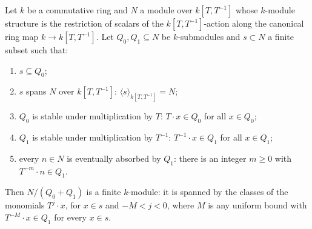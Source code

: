 \begin{theorem}
  \label{thm:two_lattice_span}
  \leanok
  Let \(k\) be a commutative ring and \(N\) a module over \(k[T,T^{-1}]\) whose
  \(k\)-module structure is the restriction of scalars of the \(k[T,T^{-1}]\)-action along the
  canonical ring map \(k \to k[T,T^{-1}]\). Let \(Q_0, Q_1 \subseteq N\) be \(k\)-submodules
  and \(s \subset N\) a finite subset such that:
  \begin{enumerate}
    \item \(s \subseteq Q_0\);
    \item \(s\) spans \(N\) over \(k[T,T^{-1}]\): \(\langle s \rangle_{k[T,T^{-1}]} = N\);
    \item \(Q_0\) is stable under multiplication by \(T\): \(T \cdot x \in Q_0\) for all
      \(x \in Q_0\);
    \item \(Q_1\) is stable under multiplication by \(T^{-1}\): \(T^{-1} \cdot x \in Q_1\) for
      all \(x \in Q_1\);
    \item every \(n \in N\) is eventually absorbed by \(Q_1\): there is an integer \(m \ge 0\)
      with \(T^{-m} \cdot n \in Q_1\).
  \end{enumerate}
  Then \(N / (Q_0 + Q_1)\) is a finite \(k\)-module: it is spanned by the classes of the
  monomials \(T^j \cdot x\), for \(x \in s\) and \(-M < j < 0\), where \(M\) is any uniform
  bound with \(T^{-M} \cdot x \in Q_1\) for every \(x \in s\).
\end{theorem}
